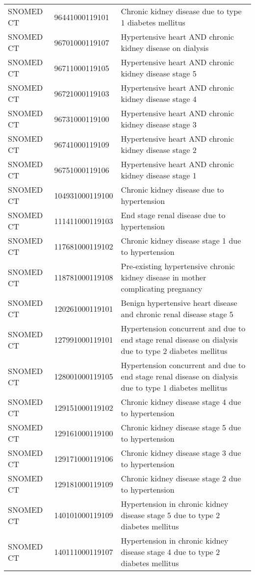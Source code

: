 \begin{longtable}{p{}p{}p{}}
  SNOMED CT & 96441000119101 & Chronic kidney disease due to type 1 diabetes mellitus \\ 
  SNOMED CT & 96701000119107 & Hypertensive heart AND chronic kidney disease on dialysis \\ 
  SNOMED CT & 96711000119105 & Hypertensive heart AND chronic kidney disease stage 5 \\ 
  SNOMED CT & 96721000119103 & Hypertensive heart AND chronic kidney disease stage 4 \\ 
  SNOMED CT & 96731000119100 & Hypertensive heart AND chronic kidney disease stage 3 \\ 
  SNOMED CT & 96741000119109 & Hypertensive heart AND chronic kidney disease stage 2 \\ 
  SNOMED CT & 96751000119106 & Hypertensive heart AND chronic kidney disease stage 1 \\ 
  SNOMED CT & 104931000119100 & Chronic kidney disease due to hypertension \\ 
  SNOMED CT & 111411000119103 & End stage renal disease due to hypertension \\ 
  SNOMED CT & 117681000119102 & Chronic kidney disease stage 1 due to hypertension \\ 
  SNOMED CT & 118781000119108 & Pre-existing hypertensive chronic kidney disease in mother complicating pregnancy \\ 
  SNOMED CT & 120261000119101 & Benign hypertensive heart disease and chronic renal disease stage 5 \\ 
  SNOMED CT & 127991000119101 & Hypertension concurrent and due to end stage renal disease on dialysis due to type 2 diabetes mellitus \\ 
  SNOMED CT & 128001000119105 & Hypertension concurrent and due to end stage renal disease on dialysis due to type 1 diabetes mellitus \\ 
  SNOMED CT & 129151000119102 & Chronic kidney disease stage 4 due to hypertension \\ 
  SNOMED CT & 129161000119100 & Chronic kidney disease stage 5 due to hypertension \\ 
  SNOMED CT & 129171000119106 & Chronic kidney disease stage 3 due to hypertension \\ 
  SNOMED CT & 129181000119109 & Chronic kidney disease stage 2 due to hypertension \\ 
  SNOMED CT & 140101000119109 & Hypertension in chronic kidney disease stage 5 due to type 2 diabetes mellitus \\ 
  SNOMED CT & 140111000119107 & Hypertension in chronic kidney disease stage 4 due to type 2 diabetes mellitus \\ 

\end{longtable}
